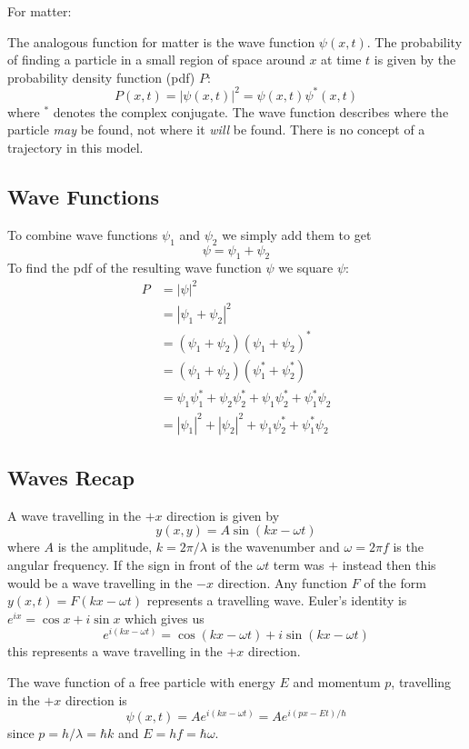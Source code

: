 \documentclass{article}
\begin{document}
    For matter:
    
    The analogous function for matter is the wave function \(\psi(x, t)\).
    The probability of finding a particle in a small region of space around \(x\) at time \(t\) is given by the probability density function (pdf) \(P\):
    \[P(x, t) = |\psi(x, t)|^2 = \psi(x, t)\psi^*(x, t)\]
    where \(^*\) denotes the complex conjugate.
    The wave function describes where the particle \emph{may} be found, not where it \emph{will} be found.
    There is no concept of a trajectory in this model.
    \subsection{Wave Functions}
    To combine wave functions \(\psi_1\) and \(\psi_2\) we simply add them to get
    \[\psi = \psi_1 + \psi_2\]
    To find the pdf of the resulting wave function \(\psi\) we square \(\psi\):
    \begin{align*}
        P &= |\psi|^2\\
        &= |\psi_1 + \psi_2|^2\\
        &= (\psi_1 + \psi_2)(\psi_1 + \psi_2)^*\\
        &= (\psi_1 + \psi_2)(\psi_1^* + \psi_2^*)\\
        &= \psi_1\psi_1^* + \psi_2\psi_2^* + \psi_1\psi_2^* + \psi_1^*\psi_2\\
        &= |\psi_1|^2 + |\psi_2|^2 + \psi_1\psi_2^* + \psi_1^*\psi_2
    \end{align*}
    
    \subsection{Waves Recap}
    A wave travelling in the \(+x\) direction is given by
    \[y(x, y) = A\sin(kx - \omega t)\]
    where \(A\) is the amplitude, \(k = 2\pi/\lambda\) is the wavenumber and \(\omega = 2\pi f\) is the angular frequency.
    If the sign in front of the \(\omega t\) term was \(+\) instead then this would be a wave travelling in the \(-x\) direction.
    Any function \(F\) of the form \(y(x, t) = F(kx - \omega t)\) represents a travelling wave.
    Euler's identity is \(e^{ix} = \cos x + i\sin x\) which gives us
    \[e^{i(kx - \omega t)} = \cos(kx - \omega t) + i\sin(kx - \omega t)\]
    this represents a wave travelling in the \(+x\) direction.
    
    The wave function of a free particle with energy \(E\) and momentum \(p\), travelling in the \(+x\) direction is
    \[\psi(x, t) = Ae^{i(kx-\omega t)} = Ae^{i(px-Et)/\hbar}\]
    since \(p = h/\lambda = \hbar k\) and \(E = hf = \hbar\omega\).
    
\end{document}
